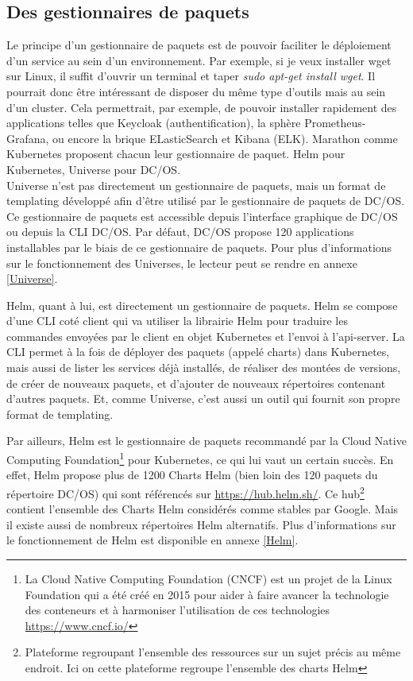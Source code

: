 \documentclass[11pt,fleqn]{book} %
\begin{document}
\subsection{Des gestionnaires de paquets}
Le principe d'un gestionnaire de paquets est de pouvoir faciliter le déploiement d'un service au sein d'un environnement. Par exemple, si je veux installer wget sur Linux, il suffit d'ouvrir un terminal et taper \textit{sudo apt-get install wget}. Il pourrait donc être intéressant de disposer du même type d'outils mais au sein d'un cluster. Cela permettrait, par exemple, de pouvoir installer rapidement des applications telles que Keycloak (authentification), la sphère Prometheus-Grafana, ou encore la brique ELasticSearch et Kibana (ELK). Marathon comme Kubernetes proposent chacun leur gestionnaire de paquet. Helm pour Kubernetes, Universe pour DC/OS. \\

Universe n'est pas directement un gestionnaire de paquets, mais un format de templating développé afin d'être utilisé par le gestionnaire de paquets de DC/OS. Ce gestionnaire de paquets est accessible depuis l'interface graphique de DC/OS ou depuis la CLI DC/OS. Par défaut, DC/OS propose 120 applications installables par le biais de ce gestionnaire de paquets. Pour plus d'informations sur le fonctionnement des Universes, le lecteur peut se rendre en annexe \ref{Universe}. \newline 

Helm, quant à lui, est directement un gestionnaire de paquets. Helm se compose d'une CLI coté client qui va utiliser la librairie Helm pour traduire les commandes envoyées par le client en objet Kubernetes et l'envoi à l'api-server. La CLI permet à la fois de déployer des paquets (appelé charts) dans Kubernetes, mais aussi de lister les services déjà installés, de réaliser des montées de versions, de créer de nouveaux paquets, et d'ajouter de nouveaux répertoires contenant d'autres paquets. Et, comme Universe, c'est aussi un outil qui fournit son propre format de templating.\newline

Par ailleurs, Helm est le gestionnaire de paquets recommandé par la Cloud Native Computing Foundation\footnote{La Cloud Native Computing Foundation (CNCF) est un projet de la Linux Foundation qui a été créé en 2015 pour aider à faire avancer la technologie des conteneurs et à harmoniser l'utilisation de ces technologies \url{https://www.cncf.io/}} pour Kubernetes, ce qui lui vaut un certain succès. En effet, Helm propose plus de 1200 Charts Helm (bien loin des 120 paquets du répertoire DC/OS) qui sont référencés sur \url{https://hub.helm.sh/}. Ce hub\footnote{Plateforme regroupant l'ensemble des ressources sur un sujet précis au même endroit. Ici on cette plateforme regroupe l'ensemble des charts Helm} contient l'ensemble des Charts Helm considérés comme stables par Google. Mais il existe aussi de nombreux répertoires Helm alternatifs. Plus d'informations sur le fonctionnement de Helm est disponible en annexe \ref{Helm}.\newline
\end{document}
